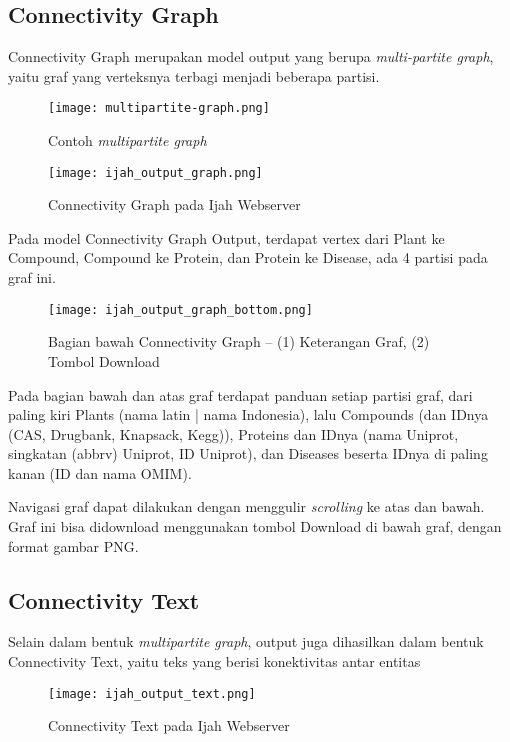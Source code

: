 	\subsection{Connectivity Graph} \label{graph}
	Connectivity Graph merupakan model output yang berupa \emph{multi-partite graph}, yaitu graf yang verteksnya terbagi menjadi beberapa partisi.

	\begin{figure}[H]
	\centering
	\texttt{[image: multipartite-graph.png]}
	\caption{Contoh \emph{multipartite graph}}
	\label{fig:multipartite-graph}
	\end{figure}

	\begin{figure}[H]
	\centering
	\texttt{[image: ijah\_output\_graph.png]}
	\caption{Connectivity Graph pada Ijah Webserver}
	\label{fig:ijah_output_graph}
	\end{figure}
	
	Pada model Connectivity Graph Output, terdapat vertex dari Plant ke Compound, Compound ke Protein, dan Protein ke Disease, ada 4 partisi pada graf ini.

	\begin{figure}[H]
	\centering
	\texttt{[image: ijah\_output\_graph\_bottom.png]}
	\caption{Bagian bawah Connectivity Graph -- (1) Keterangan Graf, (2) Tombol Download}
	\label{fig:ijah_output_graph_bottom}
	\end{figure}

	Pada bagian bawah dan atas graf terdapat panduan setiap partisi graf, dari paling kiri Plants (nama latin | nama Indonesia), lalu Compounds (dan IDnya (CAS, Drugbank, Knapsack, Kegg)), Proteins dan IDnya (nama Uniprot, singkatan (abbrv) Uniprot, ID Uniprot), dan Diseases beserta IDnya di paling kanan (ID dan nama OMIM).

	Navigasi graf dapat dilakukan dengan menggulir \emph{scrolling} ke atas dan bawah. Graf ini bisa didownload menggunakan tombol Download di bawah graf, dengan format gambar PNG.
	
	\subsection{Connectivity Text} \label{text}

	Selain dalam bentuk \emph{multipartite graph}, output juga dihasilkan dalam bentuk Connectivity Text, yaitu teks yang berisi konektivitas antar entitas

	\begin{figure}[H]
	\centering
	\texttt{[image: ijah\_output\_text.png]}
	\caption{Connectivity Text pada Ijah Webserver}
	\label{fig:ijah_output_text}
	\end{figure}	
	

